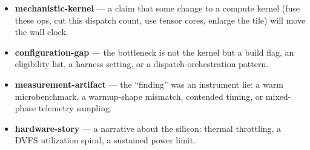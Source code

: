 \documentclass[11pt]{article}
\begin{document}
\begin{itemize}[leftmargin=1.4em,itemsep=1pt,topsep=2pt]
\item \textbf{mechanistic-kernel} --- a claim that some change to a compute kernel (fuse these ops, cut this
dispatch count, use tensor cores, enlarge the tile) will move the wall clock.
\item \textbf{configuration-gap} --- the bottleneck is not the kernel but a build flag, an eligibility
list, a harness setting, or a dispatch-orchestration pattern.
\item \textbf{measurement-artifact} --- the ``finding'' was an instrument lie: a warm microbenchmark, a
warmup-shape mismatch, contended timing, or mixed-phase telemetry sampling.
\item \textbf{hardware-story} --- a narrative about the silicon: thermal throttling, a DVFS
utilization spiral, a sustained power limit.
\end{itemize}
\end{document}
